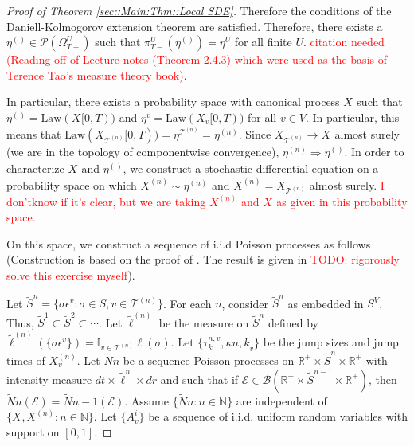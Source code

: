 \documentclass[12pt]{article}
\newcommand{\mb}{\mathbb}
\newcommand{\mc}{\mathcal}
\newcommand{\ms}{\mathscr}
\newcommand{\ra}{\rightarrow}
\newcommand{\te}{\text}
\newcommand{\ep}{\epsilon}
\newcommand{\tr}{\textcolor{red}}
\newcommand{\ind}{\hspace{24pt}}
\renewcommand{\v}{v}							%
\renewcommand{\U}{U}							%
\renewcommand{\S}{S}							%
\newcommand{\s}{\sigma}							%
\newcommand{\ev}{\ep}							%
\newcommand{\T}{T}								%
\renewcommand{\t}{t}							%
\newcommand{\sset}{\Omega}						%
\newcommand{\proj}{\pi}							%
\newcommand{\X}{X}								%
\newcommand{\vind}[1]{^{#1}}					%
\newcommand{\carp}[1]{^{#1}}					%
\newcommand{\vsi}[1]{^{#1}}						%
\newcommand{\cind}[1]{_{#1}}					%
\newcommand{\tip}[1]{#1}						%
\newcommand{\ts}[1]{_{#1}}						%
\newcommand{\slnvind}[2]{^{#1,#2}}				%
\newcommand{\tree}{\mc{T}}						%
\newcommand{\sln}[1]{^{(#1)}}					%
\newcommand{\poiss}{N}							%
\newcommand{\Sm}{\ell}							%
\renewcommand{\r}{r}							%
\newcommand{\alt}[1]{\widetilde{#1}}			%
\newcommand{\indx}[1]{_{#1}}					%
\newcommand{\mmm}{\eta}							%
\newcommand{\law}{\te{Law}}						%
\newcommand{\rt}{\tau}							%
\renewcommand{\it}{k}							%
\newcommand{\evnt}{\mc{E}}						%
\newcommand{\rv}{A}								%
\renewcommand{\mark}{\kappa}					%
\begin{document}
\begin{proof}[Proof of Theorem \ref{sec::Main:Thm::Local SDE}]
Therefore the conditions of the Daniell-Kolmogorov extension theorem are satisfied. Therefore, there exists a \(\mmm\sln{}\ts{}\in \ms{P}(\sset\vsi{\U}\ts{\T-})\) such that \(\proj\vsi{\U}\ts{\T-}(\mmm\sln{}\ts{}) =\mmm\vind{\U}\ts{}\) for all finite \(\U\). \tr{citation needed (Reading off of Lecture notes (Theorem 2.4.3) which were used as the basis of Terence Tao's measure theory book)}.

\ind In particular, there exists a probability space with canonical process \(\X\cind{}\tip{}\) such that \(\mmm\sln{}\ts{} = \law(\X\cind{}\tip{[0,\T)})\) and \(\mmm\vind{\v}\ts{} = \law(\X\cind{\v}\tip{[0,\T)})\) for all \(\v \in V\). In particular, this means that \(\law(\X\cind{\tree\sln{n}}\tip{[0,\T)}) = \mmm\vind{\tree\sln{n}}\ts{} = \mmm\sln{n}\ts{}\). Since \(\X\cind{\tree\sln{n}}\tip{} \ra \X\cind{}\tip{}\) almost surely (we are in the topology of componentwise convergence), \(\mmm\sln{n}\ts{} \Rightarrow \mmm\sln{}\ts{}\). In order to characterize \(\X\cind{}\tip{}\) and \(\mmm\sln{}\ts{}\), we construct a stochastic differential equation on a probability space on which \(\X\sln{n}\cind{}\tip{} \sim \mmm\sln{n}\ts{}\) and \(\X\sln{n}\cind{}\tip{} = \X\cind{\tree\sln{n}}\tip{}\) almost surely. \tr{I don'\t know if it's clear, but we are taking \(\X\sln{n}\cind{}\tip{}\) and \(\X\cind{}\tip{}\) as given in this probability space.}

\ind On this space, we construct a sequence of i.i.d Poisson processes as follows (Construction is based on the proof of \cite[Theorem 14.7.1(b)]{DalVer08}. The result is given in \cite[Exercise 14.7.1]{DalVer08} \tr{TODO: rigorously solve this exercise myself}).

\ind Let \(\alt{\S}^n = \{\s\ev\vind{\v}: \s\in\S,\v \in \tree\sln{n}\}\). For each \(n\), consider \(\alt{\S}^n\) as embedded in \(\S\carp{V}\). Thus, \(\alt{\S}^1 \subset \alt{\S}^2 \subset \cdots\). Let \(\alt{\Sm}\sln{n}\) be the measure on \(\alt{\S}^n\) defined by \(\alt{\Sm}\sln{n}(\{\s\ev\vind{\v}\}) = \mb{I}_{\v \in \tree\sln{n}}\Sm(\s)\). Let \(\{\rt\slnvind{n}{\v}\indx{\it},\mark{n,\it}_{\v}\}\) be the jump sizes and jump times of \(\X\sln{n}\cind{\v}\tip{}\). Let \(\alt{\poiss}{n}\) be a sequence Poisson processes on \(\mb{R}^+\times\alt{\S}^n\times \mb{R}^+\) with intensity measure \(d\t\times\alt{\Sm}^n\times d\r\) and such that if \(\evnt{} \in \ms{B}(\mb{R}^+\times\alt{\S}^{n-1}\times \mb{R}^+)\), then \(\alt{\poiss}{n}(\evnt{}) = \alt{\poiss}{n-1}(\evnt{})\). Assume \(\{\alt{\poiss}{n}:n\in\mb{N}\}\) are independent of \(\{\X\cind{}\tip{},\X\sln{n}\cind{}\tip{}:n\in\mb{N}\}\). Let \(\{\rv_{\v}^{i}\}\) be a sequence of i.i.d. uniform random variables with support on \([0,1]\).


\end{proof}
\end{document}
